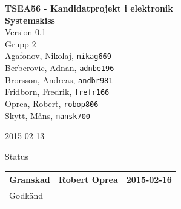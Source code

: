 \documentclass[11pt]{article}
\date{}
\begin{document}
\begin{titlepage}
\begin{center}
{\Large\bfseries TSEA56 - Kandidatprojekt i elektronik \\ Systemskiss}\\
%
\vspace{2\baselineskip}
%
Version 0.1\\
\vspace{2\baselineskip}
%
Grupp 2 \\
Agafonov, Nikolaj, 
\texttt{nikag669}
\\
Berberovic, Adnan, 
\texttt{adnbe196}
\\
Brorsson, Andreas, 
\texttt{andbr981}
\\
Fridborn, Fredrik, 
\texttt{frefr166}
\\
Oprea, Robert, 
\texttt{robop806}
\\
Skytt, Måns, 
\texttt{mansk700}

\vspace{2\baselineskip}
2015-02-13

\vspace{25\baselineskip}
Status
\begin{longtable}{|l|l|l|} \hline

Granskad &
 Robert Oprea &
 2015-02-16 \\ \hline
Godkänd &
 &
 \\ \hline
 
\end{longtable}

\end{center}
\end{titlepage}
\end{document}
